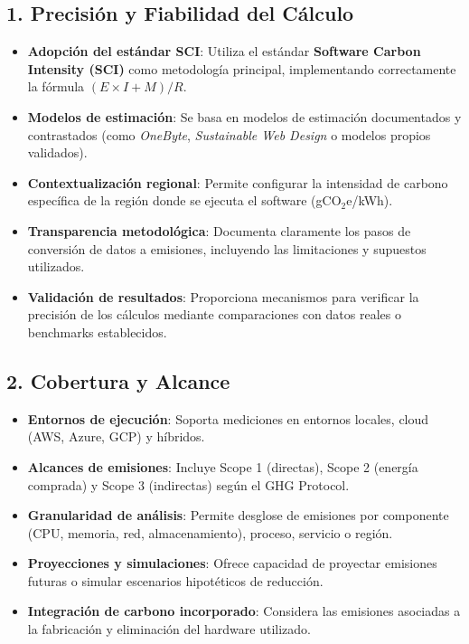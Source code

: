 \documentclass[12pt,a4paper]{report}
\begin{document}
\subsection*{1. Precisión y Fiabilidad del Cálculo}
\begin{itemize}
  \item \textbf{Adopción del estándar SCI}: Utiliza el estándar \textbf{Software Carbon Intensity (SCI)} como metodología principal, implementando correctamente la fórmula $(E \times I + M)/R$.
  \item \textbf{Modelos de estimación}: Se basa en modelos de estimación documentados y contrastados (como \textit{OneByte}, \textit{Sustainable Web Design} o modelos propios validados).
  \item \textbf{Contextualización regional}: Permite configurar la intensidad de carbono específica de la región donde se ejecuta el software (gCO$_2$e/kWh).
  \item \textbf{Transparencia metodológica}: Documenta claramente los pasos de conversión de datos a emisiones, incluyendo las limitaciones y supuestos utilizados.
  \item \textbf{Validación de resultados}: Proporciona mecanismos para verificar la precisión de los cálculos mediante comparaciones con datos reales o benchmarks establecidos.
\end{itemize}

\subsection*{2. Cobertura y Alcance}
\begin{itemize}
  \item \textbf{Entornos de ejecución}: Soporta mediciones en entornos locales, cloud (AWS, Azure, GCP) y híbridos.
  \item \textbf{Alcances de emisiones}: Incluye Scope 1 (directas), Scope 2 (energía comprada) y Scope 3 (indirectas) según el GHG Protocol.
  \item \textbf{Granularidad de análisis}: Permite desglose de emisiones por componente (CPU, memoria, red, almacenamiento), proceso, servicio o región.
  \item \textbf{Proyecciones y simulaciones}: Ofrece capacidad de proyectar emisiones futuras o simular escenarios hipotéticos de reducción.
  \item \textbf{Integración de carbono incorporado}: Considera las emisiones asociadas a la fabricación y eliminación del hardware utilizado.
\end{itemize}
\end{document}

